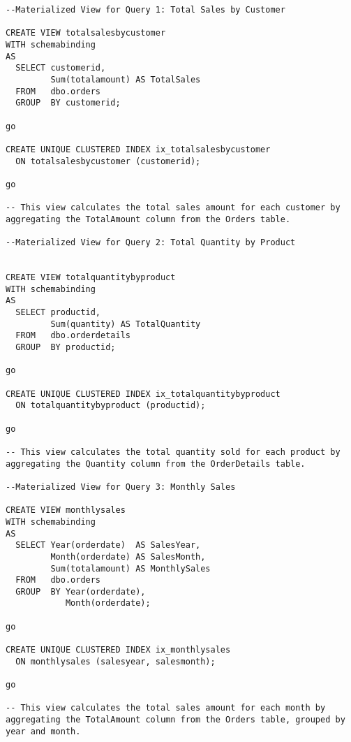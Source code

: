 \begin{lstlisting}[style=sqlstyle, caption={Materialized view creation},]
--Materialized View for Query 1: Total Sales by Customer

CREATE VIEW totalsalesbycustomer
WITH schemabinding
AS
  SELECT customerid,
         Sum(totalamount) AS TotalSales
  FROM   dbo.orders
  GROUP  BY customerid;

go

CREATE UNIQUE CLUSTERED INDEX ix_totalsalesbycustomer
  ON totalsalesbycustomer (customerid);

go 

-- This view calculates the total sales amount for each customer by aggregating the TotalAmount column from the Orders table.

--Materialized View for Query 2: Total Quantity by Product


CREATE VIEW totalquantitybyproduct
WITH schemabinding
AS
  SELECT productid,
         Sum(quantity) AS TotalQuantity
  FROM   dbo.orderdetails
  GROUP  BY productid;

go

CREATE UNIQUE CLUSTERED INDEX ix_totalquantitybyproduct
  ON totalquantitybyproduct (productid);

go 

-- This view calculates the total quantity sold for each product by aggregating the Quantity column from the OrderDetails table.

--Materialized View for Query 3: Monthly Sales

CREATE VIEW monthlysales
WITH schemabinding
AS
  SELECT Year(orderdate)  AS SalesYear,
         Month(orderdate) AS SalesMonth,
         Sum(totalamount) AS MonthlySales
  FROM   dbo.orders
  GROUP  BY Year(orderdate),
            Month(orderdate);

go

CREATE UNIQUE CLUSTERED INDEX ix_monthlysales
  ON monthlysales (salesyear, salesmonth);

go 

-- This view calculates the total sales amount for each month by aggregating the TotalAmount column from the Orders table, grouped by year and month.
\end{lstlisting}